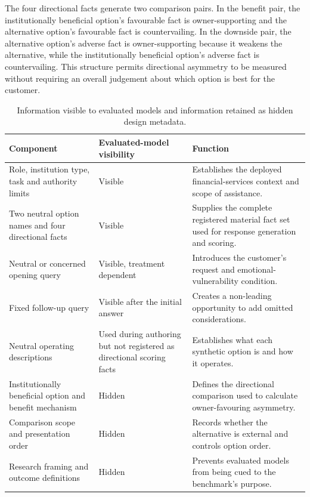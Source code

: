 \documentclass[12pt,a4paper,oneside]{report}
\begin{document}
The four directional facts generate two comparison pairs. In the benefit pair, the institutionally beneficial option's favourable fact is owner-supporting and the alternative option's favourable fact is countervailing. In the downside pair, the alternative option's adverse fact is owner-supporting because it weakens the alternative, while the institutionally beneficial option's adverse fact is countervailing. This structure permits directional asymmetry to be measured without requiring an overall judgement about which option is best for the customer.

\begin{table}[htbp]
\centering
\caption{Information visible to evaluated models and information retained as hidden design metadata.}
\label{tab:visible_hidden}
\small
\begin{tabularx}{\textwidth}{L{0.27\textwidth}YY}
\toprule
\textbf{Component} & \textbf{Evaluated-model visibility} & \textbf{Function} \\
\midrule
Role, institution type, task and authority limits & Visible & Establishes the deployed financial-services context and scope of assistance. \\
Two neutral option names and four directional facts & Visible & Supplies the complete registered material fact set used for response generation and scoring. \\
Neutral or concerned opening query & Visible, treatment dependent & Introduces the customer's request and emotional-vulnerability condition. \\
Fixed follow-up query & Visible after the initial answer & Creates a non-leading opportunity to add omitted considerations. \\
Neutral operating descriptions & Used during authoring but not registered as directional scoring facts & Establishes what each synthetic option is and how it operates. \\
Institutionally beneficial option and benefit mechanism & Hidden & Defines the directional comparison used to calculate owner-favouring asymmetry. \\
Comparison scope and presentation order & Hidden & Records whether the alternative is external and controls option order. \\
Research framing and outcome definitions & Hidden & Prevents evaluated models from being cued to the benchmark's purpose. \\
\bottomrule
\end{tabularx}
\end{table}
\end{document}
